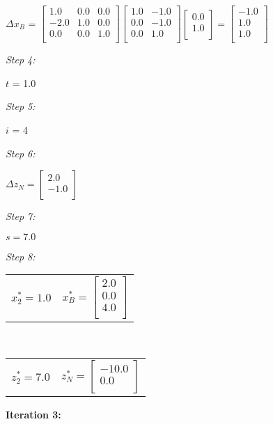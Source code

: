 \documentclass{article}
\begin{document}
\begin{center}$\Delta x_B$ = $\left[\begin{array}{ccc}1.0 & 0.0 & 0.0\\ -2.0 & 1.0 & 0.0\\ 0.0 & 0.0 & 1.0\\ \end{array}\right]\left[\begin{array}{cc}1.0 & -1.0\\ 0.0 & -1.0\\ 0.0 & 1.0\\ \end{array}\right]\left[\begin{array}{c}0.0\\ 1.0\\ \end{array}\right] = \left[\begin{array}{c}-1.0\\ 1.0\\ 1.0\\ \end{array}\right]$\end{center}
\textit{Step 4:}\\
\begin{center}
$t$ = 1.0
\end{center}
\textit{Step 5:}\\
\begin{center}
$i$ = 4
\end{center}
\textit{Step 6:}\\
\begin{center}$\Delta z_N = \left[\begin{array}{c}2.0\\ -1.0\\ \end{array}\right]$\end{center}
\textit{Step 7:}\\
\begin{center}$s = 7.0$\end{center}
\textit{Step 8:}\\
\begin{center}
\begin{tabular}{cc}$x_2^* = 1.0$ & $x_B^* = \left[\begin{array}{c}2.0\\ 0.0\\ 4.0\\ \end{array}\right]$\end{tabular}
\\
\begin{tabular}{cc}$z_2^* = 7.0$ & $z_N^* = \left[\begin{array}{c}-10.0\\ 0.0\\ \end{array}\right]$\end{tabular}
\end{center}
\textbf{Iteration 3: }
\end{document}
